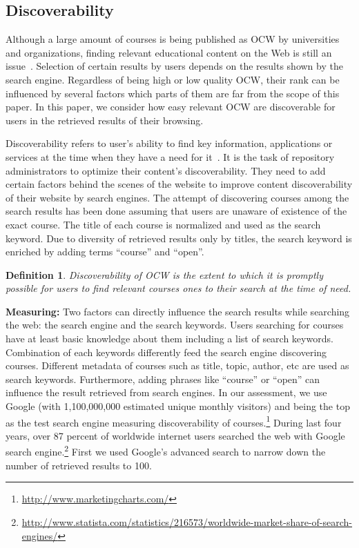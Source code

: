 \documentclass{sig-alternate}
\theoremstyle{definition}
\newtheorem{defn}{Definition}
\begin{document}
\subsection{Discoverability}
\label{sec:Discoverability}
Although a large amount of courses is being published as OCW by universities and organizations, finding relevant educational content on the Web is still an issue~\parencite{Dichev.2011}.
Selection of certain results by users depends on the results shown by the search engine.
Regardless of being high or low quality OCW, their rank can be influenced by several factors which parts of them are far from the scope of this paper.
In this paper, we consider how easy relevant OCW are discoverable for users in the retrieved results of their browsing.

Discoverability refers to user's ability to find key information, applications or services at the time when they have a need for it~\parencite{Vladoiu.2013}.
It is the task of repository administrators to optimize their content’s discoverability.
They need to add certain factors behind the scenes of the website to improve content discoverability of their website by search engines.
The attempt of discovering courses among the search results has been done assuming that users are unaware of existence of the exact course.
The title of each course is normalized  and used as the search keyword.
Due to diversity of retrieved results only by titles, the search keyword is enriched by adding terms ``course'' and ``open''.

\begin{defn}
\emph {Discoverability of OCW is the extent to which it is promptly possible for users to find relevant courses ones to their search at the time of need.}
\end{defn}

\noindent\textbf{Measuring:}
Two factors can directly influence the search results while searching the web: the search engine and the search keywords.
Users searching for courses have at least basic knowledge about them including a list of search keywords.
Combination of each keywords differently feed the search engine discovering courses.
Different metadata of courses such as title, topic, author, etc are used as search keywords.
Furthermore, adding phrases like ``course'' or ``open'' can influence the result retrieved from search engines.
In our assessment, we use Google (with 1,100,000,000 estimated unique monthly visitors) and being the top as the test search engine measuring discoverability of courses.\footnote{\url{http://www.marketingcharts.com/}}
During last four years, over 87 percent of worldwide internet users searched the web with Google search engine.\footnote{\url{http://www.statista.com/statistics/216573/worldwide-market-share-of-search-engines/}}
First we used Google's advanced search to narrow down the number of retrieved results to 100.
\end{document}
